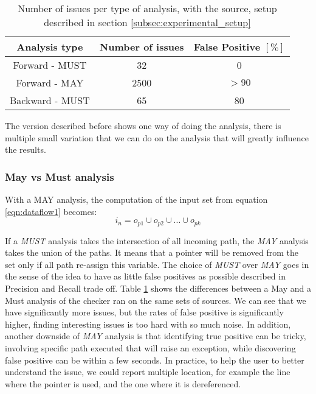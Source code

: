 \begin{table}[h]
	\centering
	\caption{Number of issues per type of analysis, with the source, setup described in section \ref{subsec:experimental_setup}}
	\label{table:issue_per_analysis_type}
	\begin{tabular}{|c|c|c|}
		\hline
		\bf Analysis type &  \bf Number of issues &  \bf False Positive $[\%]$ \\ \hline
		Forward - MUST &  32 &  0 \\ 
		Forward - MAY &  2500 & $> 90$  \\ 
		Backward - MUST &  65 & 80 \\ \hline
	\end{tabular}
\end{table}

The version described before shows one way of doing the analysis, there is multiple small variation that we can do on the analysis that will greatly influence the results.

\subsubsection{May vs Must analysis}
\label{subsubsec:may_vs_must}

With a MAY analysis, the computation of the input set from equation \ref{eqn:dataflow1} becomes:
\begin{equation}\label{eqn:mayvsmust}
i_{n} = o_{p1}  \cup   o_{p2}  \cup  ... \cup   o_{pk}
\end{equation}

If a \emph{MUST} analysis takes the intersection of all incoming path, the \emph{MAY} analysis takes the union of the paths. It means that a pointer will be removed from the set only if all path re-assign this variable.
The choice of \emph{MUST} over \emph{MAY} goes in the sense of the idea to have as little false positives as possible described in Precision and Recall trade off.
Table \ref{table:issue_per_analysis_type} shows the differences between a May and a Must analysis of the checker ran on the same sets of sources.
We can see that we have significantly more issues, but the rates of false positive is significantly higher, finding interesting issues is too hard with so much noise. 
In addition, another downside of \emph{MAY} analysis is that identifying true positive can be tricky, involving specific path executed that will raise an exception, while discovering false positive can be within a few seconds. 
In practice, to help the user to better understand the issue, we could report multiple location, for example the line where the pointer is used, and the one where it is dereferenced. 

